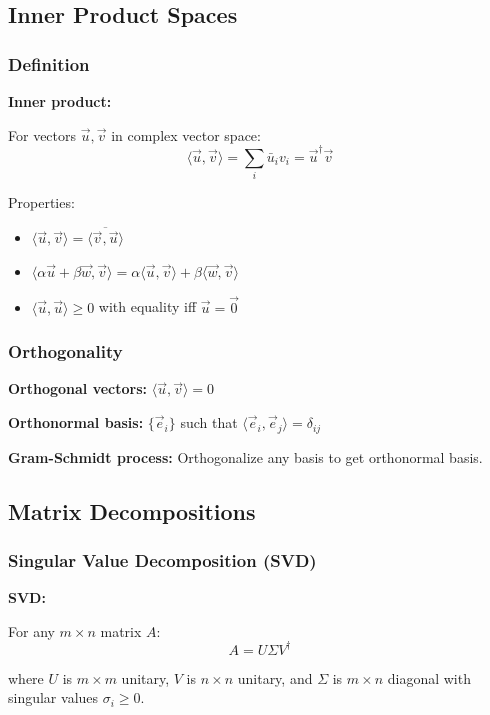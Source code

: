 \documentclass[12pt,a4paper]{article}
\begin{document}
\subsection{Inner Product Spaces}
\subsubsection{Definition}
\begin{formulabox}
\textbf{Inner product:}

For vectors $\vec{u}, \vec{v}$ in complex vector space:
\begin{equation}
\langle \vec{u}, \vec{v} \rangle = \sum_i \bar{u}_i v_i = \vec{u}^\dagger \vec{v}
\end{equation}

Properties:
\begin{itemize}
    \item $\langle \vec{u}, \vec{v} \rangle = \overline{\langle \vec{v}, \vec{u} \rangle}$
    \item $\langle \alpha\vec{u} + \beta\vec{w}, \vec{v} \rangle = \alpha\langle \vec{u}, \vec{v} \rangle + \beta\langle \vec{w}, \vec{v} \rangle$
    \item $\langle \vec{u}, \vec{u} \rangle \geq 0$ with equality iff $\vec{u} = \vec{0}$
\end{itemize}
\end{formulabox}

\subsubsection{Orthogonality}
\begin{formulabox}
\textbf{Orthogonal vectors:} $\langle \vec{u}, \vec{v} \rangle = 0$

\textbf{Orthonormal basis:} $\{\vec{e}_i\}$ such that $\langle \vec{e}_i, \vec{e}_j \rangle = \delta_{ij}$

\textbf{Gram-Schmidt process:} Orthogonalize any basis to get orthonormal basis.
\end{formulabox}

\subsection{Matrix Decompositions}
\subsubsection{Singular Value Decomposition (SVD)}
\begin{formulabox}
\textbf{SVD:}

For any $m \times n$ matrix $A$:
\begin{equation}
A = U\Sigma V^\dagger
\end{equation}

where $U$ is $m \times m$ unitary, $V$ is $n \times n$ unitary, and $\Sigma$ is $m \times n$ diagonal with singular values $\sigma_i \geq 0$.
\end{formulabox}
\end{document}
